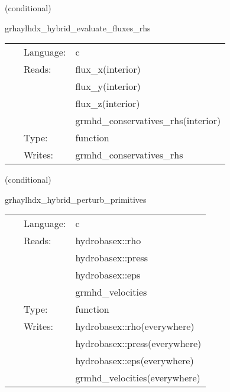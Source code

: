    (conditional) 

\hspace{5mm} grhaylhdx\_hybrid\_evaluate\_fluxes\_rhs 

\hspace{5mm}{\it hybrid version of grhaylhdx\_evaluate\_fluxes\_rhs } 


\hspace{5mm}

 \begin{tabular*}{160mm}{cll} 
~ & Language:  & c \\ 
~ & Reads:  & flux\_x(interior) \\ 
~& ~ &flux\_y(interior)\\ 
~& ~ &flux\_z(interior)\\ 
~& ~ &grmhd\_conservatives\_rhs(interior)\\ 
~ & Type:  & function \\ 
~ & Writes:  & grmhd\_conservatives\_rhs \\ 
\end{tabular*} 


\vspace{5mm}

   (conditional) 

\hspace{5mm} grhaylhdx\_hybrid\_perturb\_primitives 

\hspace{5mm}{\it hybrid version of grhaylhdx\_perturb\_primitives } 


\hspace{5mm}

 \begin{tabular*}{160mm}{cll} 
~ & Language:  & c \\ 
~ & Reads:  & hydrobasex::rho \\ 
~& ~ &hydrobasex::press\\ 
~& ~ &hydrobasex::eps\\ 
~& ~ &grmhd\_velocities\\ 
~ & Type:  & function \\ 
~ & Writes:  & hydrobasex::rho(everywhere) \\ 
~& ~ &hydrobasex::press(everywhere)\\ 
~& ~ &hydrobasex::eps(everywhere)\\ 
~& ~ &grmhd\_velocities(everywhere)\\ 
\end{tabular*} 


